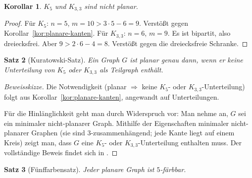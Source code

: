 \documentclass[12pt,a4paper]{amsart}
\newtheorem{theorem}{Satz}[section]
\newtheorem{corollary}[theorem]{Korollar}
\theoremstyle{definition}
\theoremstyle{remark}
\begin{document}
\begin{corollary}
$K_5$ und $K_{3,3}$ sind nicht planar.
\end{corollary}

\begin{proof}
Für $K_5$: $n = 5$, $m = 10 > 3 \cdot 5 - 6 = 9$. Verstößt gegen
Korollar~\ref{kor:planare-kanten}.
Für $K_{3,3}$: $n = 6$, $m = 9$. Es ist bipartit, also dreiecksfrei.
Aber $9 > 2 \cdot 6 - 4 = 8$. Verstößt gegen die dreiecksfreie Schranke.
\end{proof}

\begin{theorem}[Kuratowski-Satz]
\label{satz:kuratowski}
Ein Graph $G$ ist planar genau dann, wenn er keine Unterteilung von $K_5$ oder
$K_{3,3}$ als Teilgraph enthält.
\end{theorem}

\begin{proof}[Beweisskizze]
Die Notwendigkeit (planar $\Rightarrow$ keine $K_5$- oder $K_{3,3}$-Unterteilung)
folgt aus Korollar~\ref{kor:planare-kanten}, angewandt auf Unterteilungen.

Für die Hinlänglichkeit geht man durch Widerspruch vor: Man nehme an, $G$ sei
ein minimaler nicht-planarer Graph. Mithilfe der Eigenschaften minimaler
nicht-planarer Graphen (sie sind 3-zusammenhängend; jede Kante liegt auf einem
Kreis) zeigt man, dass $G$ eine $K_5$- oder $K_{3,3}$-Unterteilung enthalten
muss. Der vollständige Beweis findet sich in \cite{diestel2017}.
\end{proof}

\begin{theorem}[Fünffarbensatz]
\label{satz:fuenffarbensatz}
Jeder planare Graph ist $5$-färbbar.
\end{theorem}
\end{document}

